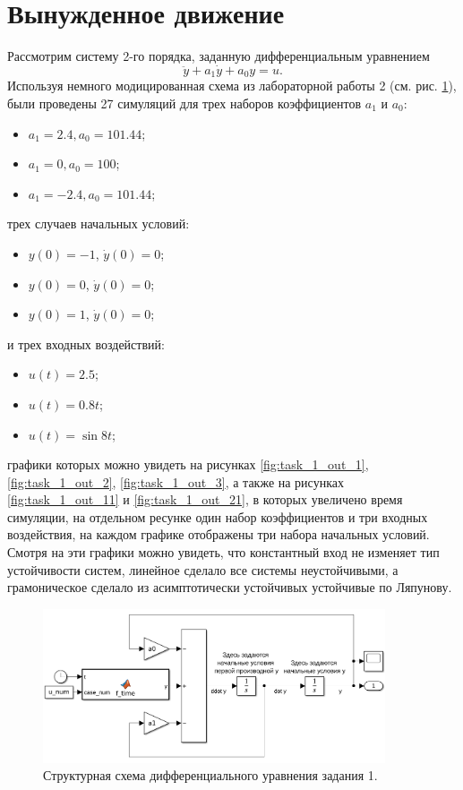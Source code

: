 \section{Вынужденное движение}

Рассмотрим систему 2-го порядка, заданную дифференциальным уравнением
\begin{equation*}
    \ddot y + a_1\dot y + a_0 y = u.
\end{equation*}
Используя немного модицированная схема из лабораторной работы 2 (см. рис. \ref{fig:task_1_slx}),
были проведены 27 симуляций для трех наборов коэффициентов $a_1$ и $a_0$:
\begin{itemize}
    \item $a_1 = 2.4, a_0 = 101.44$;
    \item $a_1 = 0, a_0 = 100$;
    \item $a_1 = -2.4, a_0 = 101.44$;
\end{itemize}
трех случаев начальных условий:
\begin{itemize}
    \item $y(0) = -1$, $\dot y(0) = 0$;
    \item $y(0) = 0$, $\dot y(0) = 0$;
    \item $y(0) = 1$, $\dot y(0) = 0$;
\end{itemize}
и трех входных воздействий:
\begin{itemize}
    \item $u(t) = 2.5$;
    \item $u(t) = 0.8t$;
    \item $u(t) = \sin 8t$;
\end{itemize}
графики которых можно увидеть на рисунках \ref{fig:task_1_out_1}, \ref{fig:task_1_out_2}, \ref{fig:task_1_out_3},
а также на рисунках \ref{fig:task_1_out_11} и \ref{fig:task_1_out_21}, в которых увеличено время симуляции,
на отдельном ресунке один набор коэффициентов и три входных воздействия, на каждом графике отображены
три набора начальных условий. Смотря на эти графики можно увидеть, что константный вход
не изменяет тип устойчивости систем, линейное сделало все системы неустойчивыми, а
грамоническое сделало из асимптотически устойчивых устойчивые по Ляпунову.

\begin{figure}
    \centering
    \includegraphics[width=0.9\textwidth]{figs/task_1_slx.png}
    \caption{Структурная схема дифференциального уравнения задания 1.}
    \label{fig:task_1_slx}
\end{figure}

